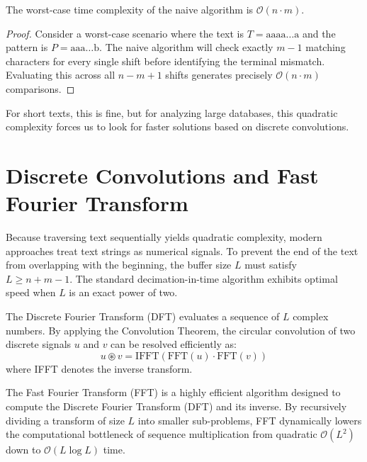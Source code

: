 \begin{theorem}
The worst-case time complexity of the naive algorithm is $\mathcal{O}(n \cdot m)$.
\end{theorem}
\begin{proof}
Consider a worst-case scenario where the text is $T = \text{aaaa} \dots \text{a}$ and the pattern is $P = \text{aaa} \dots \text{b}$. The naive algorithm will check exactly $m-1$ matching characters for every single shift before identifying the terminal mismatch. Evaluating this across all $n - m + 1$ shifts generates precisely $\mathcal{O}(n \cdot m)$ comparisons.
\end{proof}

For short texts, this is fine, but for analyzing large databases, this quadratic complexity forces us to look for faster solutions based on discrete convolutions.

\section{Discrete Convolutions and Fast Fourier Transform}

Because traversing text sequentially yields quadratic complexity, modern approaches treat text strings as numerical signals. To prevent the end of the text from overlapping with the beginning, the buffer size $L$ must satisfy $L \ge n + m - 1$. The standard decimation-in-time algorithm exhibits optimal speed when $L$ is an exact power of two.

\begin{definition}
The Discrete Fourier Transform (DFT) evaluates a sequence of $L$ complex numbers. By applying the Convolution Theorem, the circular convolution of two discrete signals $u$ and $v$ can be resolved efficiently as:
\begin{equation}
    u \circledast v = \text{IFFT}(\text{FFT}(u) \cdot \text{FFT}(v))
\end{equation}
where IFFT denotes the inverse transform.
\end{definition}

\begin{definition}
The Fast Fourier Transform (FFT) is a highly efficient algorithm designed to compute the Discrete Fourier Transform (DFT) and its inverse. By recursively dividing a transform of size $L$ into smaller sub-problems, FFT dynamically lowers the computational bottleneck of sequence multiplication from quadratic $\mathcal{O}(L^2)$ down to $\mathcal{O}(L \log L)$ time.
\end{definition}

